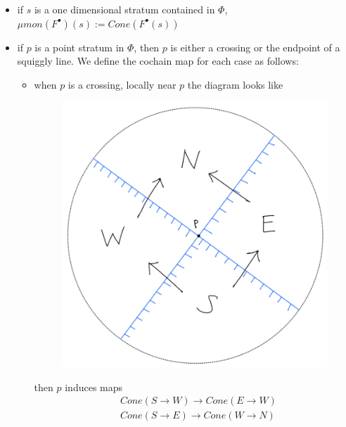 \begin{itemize}
\item if $s$ is a one dimensional stratum contained in $\Phi$, $\mu mon (F^\bullet)(s):=Cone(F^\bullet(s))$

\item if $p$ is a point stratum in $\Phi$, then $p$ is either a crossing or the endpoint of a squiggly line. We define the cochain map for each case as follows:
\begin{itemize}
\item when $p$ is a crossing, locally near $p$ the diagram looks like
\begin{figure}[H] 
    \centering
    \includegraphics[scale = 0.95]{diagrams/intro/3.png}
    \caption{}
    \label{fig:your-label}
\end{figure}
then $p$ induces maps
\begin{align*}
& Cone(S\rightarrow W) \rightarrow Cone(E\rightarrow W)\\
& Cone(S\rightarrow E) \rightarrow Cone(W\rightarrow N)\\
\end{align*}


\end{itemize}
\end{itemize}
